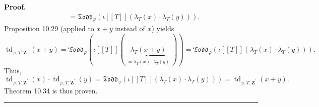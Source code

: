 \documentclass[numbers=enddot,12pt,final,onecolumn,notitlepage]{scrartcl}%
\newenvironment{proof}[1][Proof]{\noindent\textbf{#1.} }{\ \rule{0.5em}{0.5em}}
\begin{document}
\begin{proof}
\begin{align*}
&  =\mathfrak{Todd}_{\varphi}\left(  \iota\left[  \left[  T\right]  \right]
\left(  \lambda_{T}\left(  x\right)  \cdot\lambda_{T}\left(  y\right)
\right)  \right)  .
\end{align*}
Proposition 10.29 (applied to $x+y$ instead of $x$) yields%
\[
\operatorname*{td}\nolimits_{\varphi,T,\mathbf{Z}^{\prime}}\left(  x+y\right)
=\mathfrak{Todd}_{\varphi}\left(  \iota\left[  \left[  T\right]  \right]
\left(  \underbrace{\lambda_{T}\left(  x+y\right)  }_{\substack{=\lambda
_{T}\left(  x\right)  \cdot\lambda_{T}\left(  y\right)  }}\right)  \right)
=\mathfrak{Todd}_{\varphi}\left(  \iota\left[  \left[  T\right]  \right]
\left(  \lambda_{T}\left(  x\right)  \cdot\lambda_{T}\left(  y\right)
\right)  \right)  .
\]
Thus,%
\[
\operatorname*{td}\nolimits_{\varphi,T,\mathbf{Z}^{\prime}}\left(  x\right)
\cdot\operatorname*{td}\nolimits_{\varphi,T,\mathbf{Z}^{\prime}}\left(
y\right)  =\mathfrak{Todd}_{\varphi}\left(  \iota\left[  \left[  T\right]
\right]  \left(  \lambda_{T}\left(  x\right)  \cdot\lambda_{T}\left(
y\right)  \right)  \right)  =\operatorname*{td}\nolimits_{\varphi
,T,\mathbf{Z}^{\prime}}\left(  x+y\right)  .
\]
Theorem 10.34 is thus proven.
\end{proof}
\end{document}
